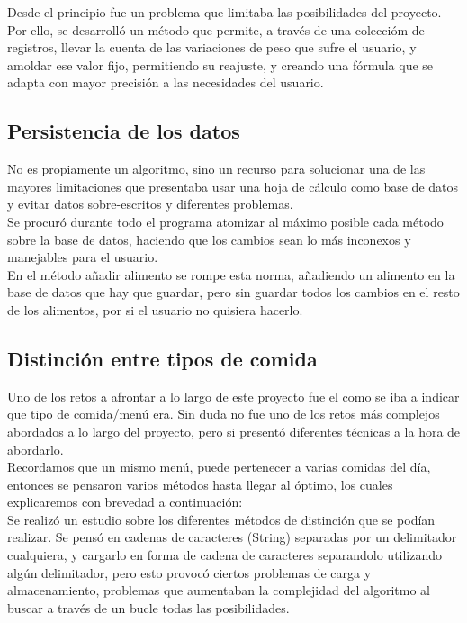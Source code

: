Desde el principio fue un problema que limitaba las posibilidades del proyecto. Por ello, se desarrolló un método que permite, a través de una coleccióm de registros, llevar la cuenta de las variaciones de peso que sufre el usuario, y amoldar ese valor fijo, permitiendo su reajuste, y creando una fórmula que se adapta con mayor precisión a las necesidades del usuario.\\

\subsection{Persistencia de los datos}
No es propiamente un algoritmo, sino un recurso para solucionar una de las mayores limitaciones que presentaba usar una hoja de cálculo como base de datos y evitar  datos sobre-escritos y diferentes problemas.\\
Se procuró durante todo el programa atomizar al máximo posible cada método sobre la base de datos, haciendo que los cambios sean lo más inconexos y manejables para el usuario. \\

En el método añadir alimento se rompe esta norma, añadiendo un alimento en la base de datos que hay que guardar, pero sin guardar todos los cambios en el resto de los alimentos, por si el usuario no quisiera hacerlo. 
\subsection{Distinción entre tipos de comida}
Uno de los retos a afrontar a lo largo de este proyecto fue el como se iba a indicar que tipo de comida/menú era. Sin duda no fue uno de los retos más complejos abordados a lo largo del proyecto, pero si presentó diferentes técnicas a la hora de abordarlo.\\

Recordamos que un mismo menú, puede pertenecer a varias comidas del día, entonces se pensaron varios métodos hasta llegar al óptimo, los cuales explicaremos con brevedad a continuación: \\

Se realizó un estudio sobre los diferentes métodos de distinción que se podían realizar. Se pensó en cadenas de caracteres (String) separadas por un delimitador cualquiera, y cargarlo en forma de cadena de caracteres separandolo utilizando algún delimitador, pero esto provocó ciertos problemas de carga y almacenamiento, problemas  que aumentaban la complejidad del algoritmo al buscar a través de un bucle todas las posibilidades.\\

